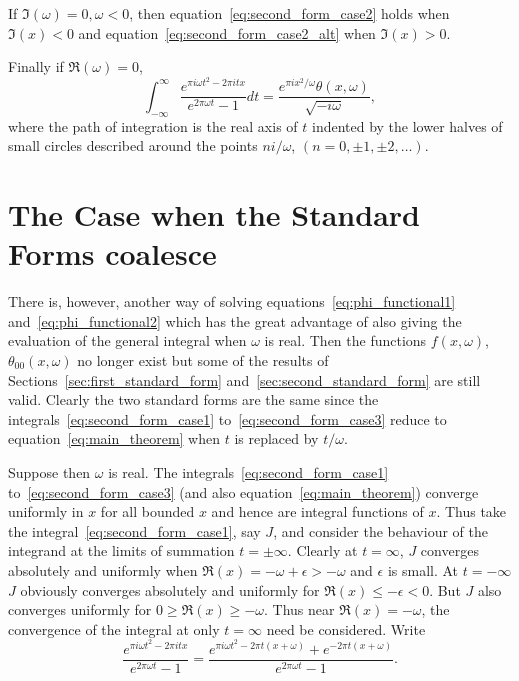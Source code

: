 \documentclass[12pt]{article}
\theoremstyle{remark}
\begin{document}
If $\Im(\omega) = 0, \omega < 0$, then equation~\eqref{eq:second_form_case2} holds when $\Im(x) < 0$ and equation~\eqref{eq:second_form_case2_alt} when $\Im(x) > 0$.

Finally if $\Re(\omega) = 0$,
\begin{equation}\label{eq:second_form_case3}
\int_{-\infty}^\infty \frac{e^{\pi i\omega t^2 - 2\pi itx}}{e^{2\pi\omega t} - 1} dt = \frac{e^{\pi ix^2/\omega} \theta(x, \omega)}{\sqrt{-i\omega}},
\end{equation}
where the path of integration is the real axis of $t$ indented by the lower halves of small circles described around the points $ni/\omega$, $(n = 0, \pm 1, \pm 2, \ldots)$.

\section{The Case when the Standard Forms coalesce}\label{sec:coalesce_case}

There is, however, another way of solving equations~\eqref{eq:phi_functional1} and~\eqref{eq:phi_functional2} which has the great advantage of also giving the evaluation of the general integral when $\omega$ is real. Then the functions $f(x, \omega)$, $\theta_{00}(x, \omega)$ no longer exist but some of the results of Sections~\ref{sec:first_standard_form} and~\ref{sec:second_standard_form} are still valid. Clearly the two standard forms are the same since the integrals~\eqref{eq:second_form_case1} to~\eqref{eq:second_form_case3} reduce to equation~\eqref{eq:main_theorem} when $t$ is replaced by $t/\omega$.

Suppose then $\omega$ is real. The integrals~\eqref{eq:second_form_case1} to~\eqref{eq:second_form_case3} (and also equation~\eqref{eq:main_theorem}) converge uniformly in $x$ for all bounded $x$ and hence are integral functions of $x$. Thus take the integral~\eqref{eq:second_form_case1}, say $J$, and consider the behaviour of the integrand at the limits of summation $t = \pm \infty$. Clearly at $t = \infty$, $J$ converges absolutely and uniformly when $\Re(x) = -\omega + \epsilon > -\omega$ and $\epsilon$ is small. At $t = -\infty$ $J$ obviously converges absolutely and uniformly for $\Re(x) \leq -\epsilon < 0$. But $J$ also converges uniformly for $0 \geq \Re(x) \geq -\omega$. Thus near $\Re(x) = -\omega$, the convergence of the integral at only $t = \infty$ need be considered. Write
\begin{equation}\label{eq:splitting}
\frac{e^{\pi i\omega t^2 - 2\pi itx}}{e^{2\pi\omega t} - 1} = \frac{e^{\pi i\omega t^2 - 2\pi t(x+\omega)} + e^{-2\pi t(x+\omega)}}{e^{2\pi\omega t} - 1}.
\end{equation}
\end{document}
